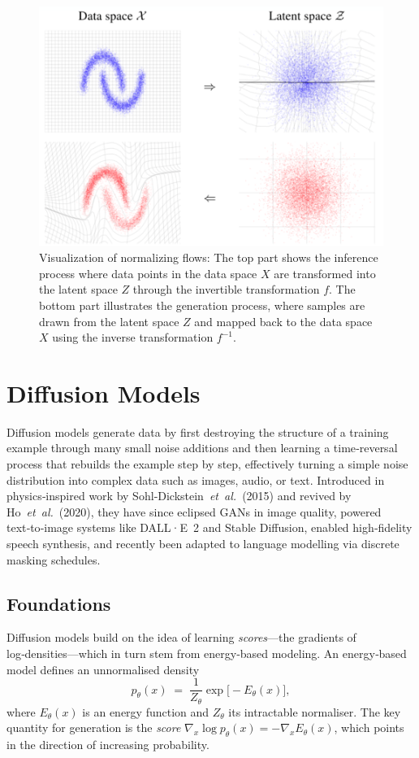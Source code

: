 \documentclass{article}
\begin{document}
\begin{figure}[ht]
    \centering
    \includegraphics[width=0.75\linewidth]{graphics/S9Flows/space_transformations.png}
    \caption{Visualization of normalizing flows: The top part shows the inference process where data points in the data space \(X\) are transformed into the latent space \(Z\) through the invertible transformation \(f\). The bottom part illustrates the generation process, where samples are drawn from the latent space \(Z\) and mapped back to the data space \(X\) using the inverse transformation \(f^{-1}\).}
    \label{fig:space-transformations}
\end{figure}
\section{Diffusion Models}\label{sec:diffusion}

Diffusion models generate data by first destroying the structure of a training example through many small noise additions and then learning a time‑reversal process that rebuilds the example step by step, effectively turning a simple noise distribution into complex data such as images, audio, or text.  Introduced in physics‑inspired work by Sohl‑Dickstein \textit{et al.}\ (2015) and revived by Ho \textit{et al.}\ (2020), they have since eclipsed GANs in image quality, powered text‑to‑image systems like DALL·E 2 and Stable Diffusion, enabled high‑fidelity speech synthesis, and recently been adapted to language modelling via discrete masking schedules.

\subsection{Foundations}
Diffusion models build on the idea of learning \emph{scores}—the gradients of log‑densities—which in turn stem from energy‑based modeling.  An energy‑based model defines an unnormalised density
\[
  p_\theta(x) \;=\;\frac{1}{Z_\theta}\exp\bigl[-E_\theta(x)\bigr],
\]
where \(E_\theta(x)\) is an energy function and \(Z_\theta\) its intractable normaliser.  The key quantity for generation is the \emph{score} 
\(\nabla_x\log p_\theta(x) = -\nabla_x E_\theta(x)\), 
which points in the direction of increasing probability.
\end{document}
